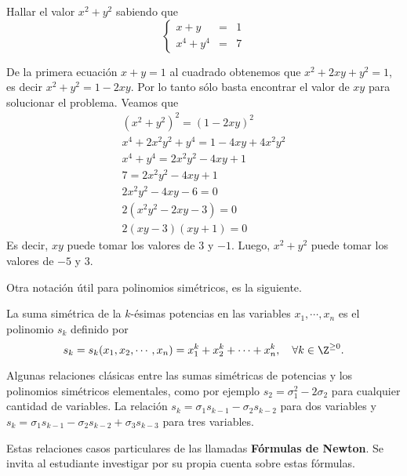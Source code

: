 \begin{section-example.tcb}
    Hallar el valor $x^2 + y^2$ sabiendo que
    \[
        \left\{
        \begin{array}{rcl}
            x + y & =& 1\\
            x^4 + y^4 & =& 7
        \end{array}
        \right.
    \]
\end{section-example.tcb}
\begin{solution}
    De la primera ecuación $x + y = 1$ al cuadrado obtenemos que $x^2 + 2xy + y^2 = 1$, es decir $x^2 + y^2 = 1 - 2xy$.
    Por lo tanto sólo basta encontrar el valor de $xy$ para solucionar el problema.
    Veamos que
    \begin{gather*}
        (x^2 + y^2)^2 = (1 - 2xy)^2 \\
        x^4 + 2x^2 y^2 + y^4 = 1 - 4xy + 4x^2 y^2\\
        x^4 + y^4 = 2x^2 y^2 - 4xy + 1\\
        7 = 2x^2 y^2 - 4xy + 1\\
        2x^2 y^2 - 4xy - 6 = 0\\
        2(x^2 y^2 - 2xy - 3) = 0\\
        2(xy - 3)(xy + 1) = 0
    \end{gather*}
    Es decir, $xy$ puede tomar los valores de $3$ y $-1$.
    Luego, $x^2 + y^2$ puede tomar los valores de $\boxed{-5}$ y $\boxed{3}$.
\end{solution}

Otra notación útil para polinomios simétricos, es la siguiente.

\begin{section-definition.tcb}
    La suma simétrica de la $k$-ésimas potencias en las variables $x_1, \cdots, x_n$ es el polinomio $s_k$ definido por
    \[s_k = s_k(x_1, x_2, \cdots, x_n) = x_1^k + x_2^k + \cdots + x_n^k, \quad \forall k \in \Z^{\geq 0}.\]
\end{section-definition.tcb}

Algunas relaciones clásicas entre las sumas simétricas de potencias y los polinomios simétricos elementales, como por ejemplo $\boxed{s_2 = \sigma_1^2 - 2\sigma_2}$ para cualquier cantidad de variables.
La relación $\boxed{s_k = \sigma_1 s_{k - 1} - \sigma_2 s_{k - 2}}$ para dos variables y $\boxed{s_k = \sigma_1 s_{k - 1} - \sigma_2 s_{k - 2} + \sigma_3 s_{k - 3}}$ para tres variables.

Estas relaciones casos particulares de las llamadas \textbf{Fórmulas de Newton}.
Se invita al estudiante investigar por su propia cuenta sobre estas fórmulas.



